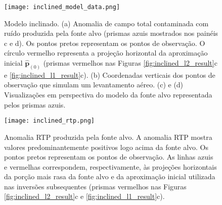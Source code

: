 \pagebreak

\begin{figure}[!htb]
	\centering
 	\texttt{[image: inclined\_model\_data.png]}
	\caption{Modelo inclinado. (a) Anomalia de campo total contaminada com ruído produzida pela fonte alvo (prismas azuis mostrados nos painéis c e d). Os pontos pretos representam os pontos de observação. O círculo vermelho representa a projeção horizontal da aproximação inicial $\hat{\mathbf{p}}_{(0)}$ (prismas vermelhos nas Figuras
		\ref{fig:inclined_l2_result}c e \ref{fig:inclined_l1_result}c). (b) Coordenadas verticais dos pontos de observação que simulam um levantamento aéreo.
		(c) e (d) Visualizações em perspectiva do modelo da fonte alvo representada pelos prismas azuis.
	}
	\label{fig:inclined_model}
\end{figure}
\pagebreak

\begin{figure}[!htb]
	\centering
	\texttt{[image: inclined\_rtp.png]}
	\caption{Anomalia RTP produzida pela fonte alvo. 
		A anomalia RTP mostra valores predominantemente positivos logo acima da fonte alvo. Os pontos pretos representam os pontos de observação. As linhas azuis e vermelhas correspondem, respectivamente, às projeções horizontais da porção mais rasa da fonte alvo e da aproximação inicial utilizada nas inversões subsequentes (prismas vermelhos nas Figuras \ref{fig:inclined_l2_result}c e 
		\ref{fig:inclined_l1_result}c).
	}
	\label{fig:inclined_model_rtp}
\end{figure}

\pagebreak

